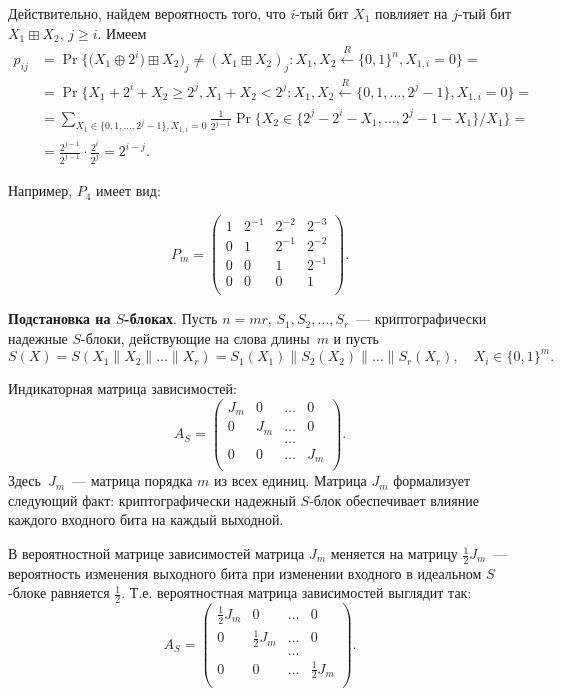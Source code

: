 \documentclass[a4paper,12pt]{report}
\theoremstyle{plain} %
\theoremstyle{definition}
\theoremstyle{remark}
\begin{document}
\begin{large}
Действительно,
найдем вероятность того, что $i$-тый бит $X_1$ повлияет на $j$-тый бит
$X_1\boxplus X_2$, $j\geq i$.
Имеем
\begin{align*}
p_{ij}
&= 
\Pr\bigg\{\big(X_1 \oplus 2^i)\boxplus X_2\big)_j \neq (X_1 \boxplus X_2)_j\colon
X_1, X_2\stackrel{R}\leftarrow \{0,1\}^n, X_{1,i} = 0\bigg\} =\\
&=
\Pr\bigg\{X_1+2^i+X_2\geq 2^j, X_1 + X_2 < 2^j\colon 
X_1, X_2\stackrel{R}\leftarrow\{0,1,\ldots,2^j-1\}, X_{1,i} = 0\bigg\}=\\
&=
\sum_{X_1\in \{0,1,\ldots,2^j-1\}, X_{1,i}=0}
\frac{1}{2^{j-1}}\Pr\bigg\{X_2 \in \{2^j-2^i-X_1,\ldots,2^j-1-X_1\}/X_1\bigg\} =\\
&=
\frac{2^{j-1}}{2^{j-1}}\cdot \frac{2^i}{2^j} = 2^{i-j}.
\end{align*}

Например, $P_4$ имеет вид:

$$
P_m = 
\begin{pmatrix} 
1 & 2^{-1} & 2^{-2} & 2^{-3}\\ 
0 & 1 & 2^{-1} & 2^{-2}\\ 
0 & 0 & 1 & 2^{-1}\\
0 & 0 & 0 & 1\\
\end{pmatrix}.
$$

{\bf Подстановка на $S$-блоках}.
Пусть $n=mr$, $S_1,S_2,\ldots,S_r$~---
криптографически надежные $S$-блоки,
действующие на слова длины~$m$ и 
пусть 
$$
S(X)=S(X_1\parallel X_2\parallel\ldots\parallel X_r)=
S_1(X_1)\parallel S_2(X_2)\parallel\ldots\parallel S_r(X_r),\quad
X_i\in\{0,1\}^m.
$$

Индикаторная матрица зависимостей:
$$
A_S = 
\begin{pmatrix} 
J_m & 0 & \ldots & 0\\ 
0 & J_m & \ldots & 0\\
  &     & \ldots &\\
0 &  0  & \ldots & J_m\\
\end{pmatrix}.
$$
Здесь~$J_m$~--- матрица порядка $m$ из всех единиц.
Матрица $J_m$ формализует следующий факт: 
криптографически надежный $S$-блок обеспечивает 
влияние каждого входного бита на каждый выходной.

В вероятностной матрице зависимостей матрица 
$J_m$ меняется на матрицу $\frac{1}{2}J_m$~---
вероятность изменения выходного бита при изменении 
входного в идеальном $S$-блоке равняется $\frac{1}{2}$. Т.е. вероятностная матрица зависимостей выглядит так:
$$
A_S = 
\begin{pmatrix} 
\frac{1}{2}J_m & 0 & \ldots & 0\\ 
0 &\frac{1}{2} J_m & \ldots & 0\\
  &     & \ldots &\\
0 &  0  & \ldots & \frac{1}{2}J_m\\
\end{pmatrix}.
$$


\end{large}
\end{document}
